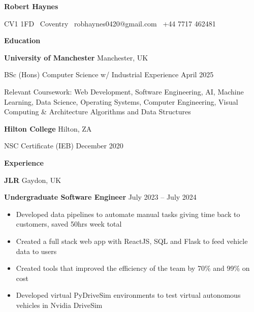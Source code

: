\documentclass[11pt]{article}
\begin{document}
\begin{center}
    \textbf{Robert Haynes}\\ 
    \hrulefill
\end{center}

\begin{center}
    CV1 1FD \textbullet \ Coventry \textbullet \ robhaynes0420@gmail.com \textbullet \ +44 7717 462481
\end{center}

\vspace{0.5pt}

\begin{center}
    \textbf{Education}
\end{center}
\textbf{University of Manchester} \hfill Manchester, UK

BSc (Hons) Computer Science w/ Industrial Experience \hfill April 2025

Relevant Coursework: Web Development, Software Engineering, AI, Machine Learning, Data Science, Operating Systems, Computer Engineering, Visual Computing & Architecture Algorithms and Data Structures

\vspace{12pt}

\textbf{Hilton College} \hfill	Hilton, ZA

NSC Certificate (IEB) \hfill December 2020

\vspace{12pt}

\begin{center}
    \textbf{Experience}
\end{center}
\textbf{JLR} \hfill Gaydon, UK

\textbf{Undergraduate Software Engineer} \hfill July 2023 – July 2024
\begin{itemize}[noitemsep, topsep=0pt, partopsep=0pt, parsep=0pt]
    \item Developed data pipelines to automate manual tasks giving time back to customers, saved 50hrs week total
    \item Created a full stack web app with ReactJS, SQL and Flask to feed vehicle data to users
    \item Created tools that improved the efficiency of the team by 70\% and 99\% on cost 
    \item Developed virtual PyDriveSim environments to test virtual autonomous vehicles in Nvidia DriveSim
\end{itemize}

\vspace{12pt}
\end{document}
